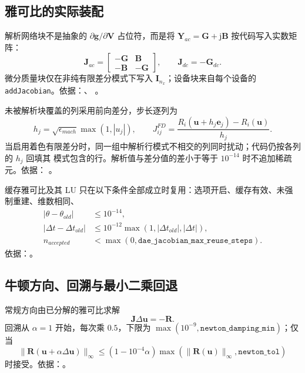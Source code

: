\subsection{雅可比的实际装配}
解析网络块不是抽象的 $\partial\mathbf g/\partial\mathbf V$ 占位符，而是将
$\mathbf Y_{ac}=\mathbf G+\mathrm j\mathbf B$ 按代码写入实数矩阵：
\begin{equation}
 \mathbf J_{ac}=\begin{bmatrix}-\mathbf G&\mathbf B\\-\mathbf B&-\mathbf G\end{bmatrix},
 \qquad \mathbf J_{dc}=-\mathbf G_{dc}.
\end{equation}
微分质量块仅在非纯有限差分模式下写入 $\mathbf I_{n_x}$；设备块来自每个设备的
\texttt{addJacobian}。依据：、
。

未被解析块覆盖的列采用前向差分，步长逐列为
\begin{equation}
 h_j=\sqrt{\epsilon_{mach}}\max(1,|u_j|),\qquad
 J_{ij}^{FD}=\frac{R_i(\mathbf u+h_j\mathbf e_j)-R_i(\mathbf u)}{h_j}.
\end{equation}
当启用着色有限差分时，同一组中解析行模式不相交的列同时扰动；代码仍按各列的 $h_j$ 回填其
模式包含的行。解析值与差分值的差小于等于 $10^{-14}$ 时不追加稀疏元。依据：
。

缓存雅可比及其 LU 只在以下条件全部成立时复用：选项开启、缓存有效、未强制重建、维数相同、
\begin{align}
 |\theta-\theta_{old}|&\leq10^{-14},\\
 |\Delta t-\Delta t_{old}|&\leq10^{-12}
 \max(1,|\Delta t_{old}|,|\Delta t|),\\
 n_{accepted}&<\max(0,\texttt{dae\_jacobian\_max\_reuse\_steps}).
\end{align}
依据：。

\subsection{牛顿方向、回溯与最小二乘回退}
常规方向由已分解的雅可比求解
\begin{equation}
 \mathbf J\Delta\mathbf u=-\mathbf R.
\end{equation}
回溯从 $\alpha=1$ 开始，每次乘 $0.5$，下限为
$\max(10^{-9},\texttt{newton\_damping\_min})$；仅当
\begin{equation}
 \|\mathbf R(\mathbf u+\alpha\Delta\mathbf u)\|_\infty
 \leq(1-10^{-4}\alpha)\max(\|\mathbf R(\mathbf u)\|_\infty,
 \texttt{newton\_tol})
\end{equation}
时接受。依据：。

